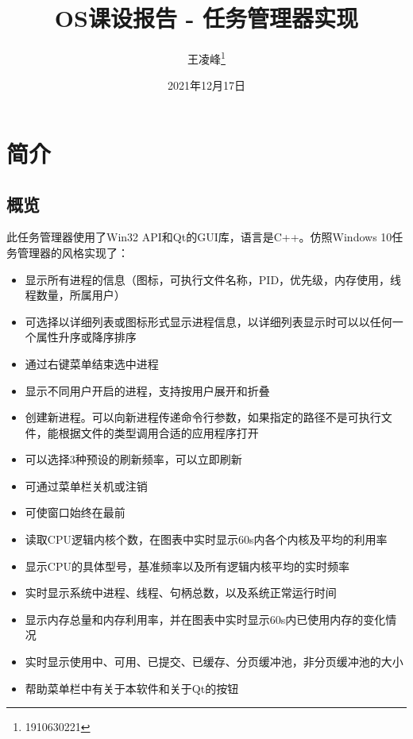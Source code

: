 \documentclass[UTF8,twoside,titlepage]{ctexart}
\title{OS课设报告 - 任务管理器实现}
\author{王凌峰\thanks{1910630221}}
\date{2021年12月17日}
\begin{document}
\lstset{
    numberstyle=\footnotesize,
    stringstyle=\ttfamily,
    commentstyle=\upshape,
    showstringspaces=false,
    numbers=left,
    numbersep=8pt,
    tabsize=4,
    language=C++
}

\maketitle

\tableofcontents

\section{简介}

\subsection{概览}
此任务管理器使用了Win32 API和Qt的GUI库，语言是C++。仿照Windows 10任务管理器的风格实现了：

\begin{itemize}
    \item 显示所有进程的信息（图标，可执行文件名称，PID，优先级，内存使用，线程数量，所属用户）
    \item 可选择以详细列表或图标形式显示进程信息，以详细列表显示时可以以任何一个属性升序或降序排序
    \item 通过右键菜单结束选中进程
    \item 显示不同用户开启的进程，支持按用户展开和折叠
    \item 创建新进程。可以向新进程传递命令行参数，如果指定的路径不是可执行文件，能根据文件的类型调用合适的应用程序打开
    \item 可以选择3种预设的刷新频率，可以立即刷新
    \item 可通过菜单栏关机或注销
    \item 可使窗口始终在最前
    \item 读取CPU逻辑内核个数，在图表中实时显示60s内各个内核及平均的利用率
    \item 显示CPU的具体型号，基准频率以及所有逻辑内核平均的实时频率
    \item 实时显示系统中进程、线程、句柄总数，以及系统正常运行时间
    \item 显示内存总量和内存利用率，并在图表中实时显示60s内已使用内存的变化情况
    \item 实时显示使用中、可用、已提交、已缓存、分页缓冲池，非分页缓冲池的大小
    \item 帮助菜单栏中有关于本软件和关于Qt的按钮
\end{itemize}
\end{document}
